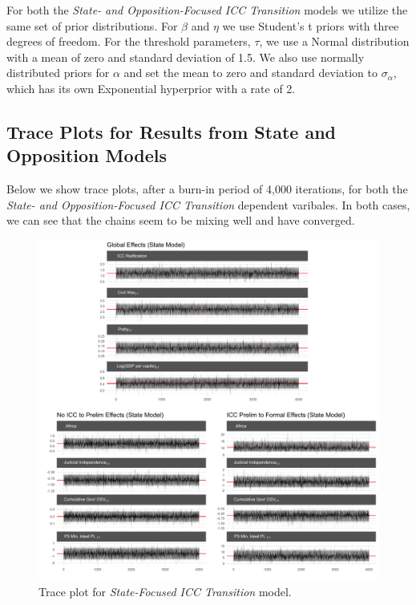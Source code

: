 For both the \emph{State- and Opposition-Focused ICC Transition} models we utilize the same set of prior distributions. For $\beta$ and $\eta$ we use Student's t priors with three degrees of freedom. For the threshold parameters, $\tau$, we use a Normal distribution with a mean of zero and standard deviation of 1.5. We also use normally distributed priors for $\alpha$ and set the mean to zero and standard deviation to $\sigma_{\alpha}$, which  has its own Exponential hyperprior with a rate of 2.

\clearpage
\subsection*{Trace Plots for Results from State and Opposition Models}

Below we show trace plots, after a burn-in period of 4,000 iterations, for both the \emph{State- and Opposition-Focused ICC Transition} dependent varibales. In both cases, we can see that the chains seem to be mixing well and have converged.

\begin{figure}
    \centering
    \includegraphics[width=1\textwidth]{stateCoefTrace.pdf}
    \caption{Trace plot for \emph{State-Focused ICC Transition} model.}
    \label{fig:stateTrace}
\end{figure}
\FloatBarrier

